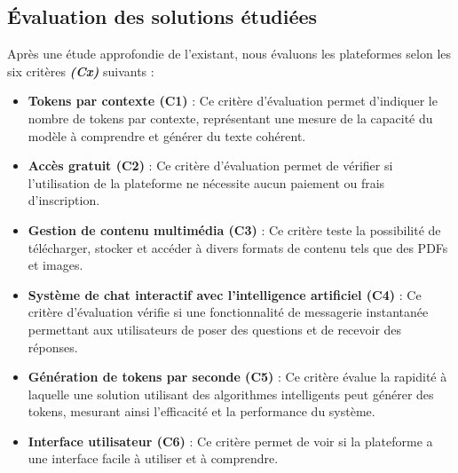 \subsection{Évaluation des solutions étudiées}
Après une étude approfondie de l’existant, nous évaluons les plateformes selon les six critères \textbf{\textit{(Cx)}} suivants :
\begin{itemize}[itemsep=2pt, parsep=2pt]
    \item \textbf{Tokens par contexte (C1)} : Ce critère d’évaluation permet d’indiquer le nombre de tokens par contexte, représentant une mesure de la capacité du modèle à comprendre et générer du texte cohérent.
    \item \textbf{Accès gratuit (C2)} : Ce critère d’évaluation permet de vérifier si l'utilisation de la plateforme ne nécessite aucun paiement ou frais d'inscription.
    \item \textbf{Gestion de contenu multimédia (C3)} : Ce critère teste la possibilité de télécharger, stocker et accéder à divers formats de contenu tels que des PDFs et images.
    \item \textbf{Système de chat interactif avec l’intelligence artificiel (C4)} : Ce critère d’évaluation vérifie si une fonctionnalité de messagerie instantanée permettant aux utilisateurs de poser des questions et de recevoir des réponses.
    \item \textbf{Génération de tokens par seconde (C5)} : Ce critère évalue la rapidité à laquelle une solution utilisant des algorithmes intelligents peut générer des tokens, mesurant ainsi l'efficacité et la performance du système.
    \item \textbf{Interface utilisateur (C6)} : Ce critère permet de voir si la plateforme a une interface facile à utiliser et à comprendre.
\end{itemize}

